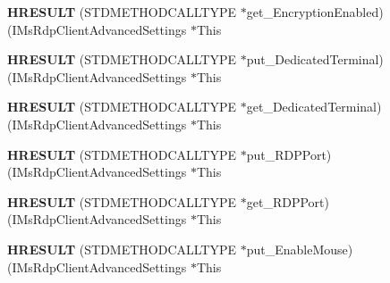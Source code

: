 \begin{DoxyCompactItemize}
\item 
\mbox{\label{struct_i_ms_rdp_client_advanced_settings_vtbl_a68eb7122c2b54db059b795c253e03cb8}} 
{\bfseries H\+R\+E\+S\+U\+LT} (S\+T\+D\+M\+E\+T\+H\+O\+D\+C\+A\+L\+L\+T\+Y\+PE $\ast$get\+\_\+\+Encryption\+Enabled)(I\+Ms\+Rdp\+Client\+Advanced\+Settings $\ast$This
\item 
\mbox{\label{struct_i_ms_rdp_client_advanced_settings_vtbl_a6a3a48647570818cb514e15f63d0fb10}} 
{\bfseries H\+R\+E\+S\+U\+LT} (S\+T\+D\+M\+E\+T\+H\+O\+D\+C\+A\+L\+L\+T\+Y\+PE $\ast$put\+\_\+\+Dedicated\+Terminal)(I\+Ms\+Rdp\+Client\+Advanced\+Settings $\ast$This
\item 
\mbox{\label{struct_i_ms_rdp_client_advanced_settings_vtbl_af6a54e4b15f00903c8cc01e390228160}} 
{\bfseries H\+R\+E\+S\+U\+LT} (S\+T\+D\+M\+E\+T\+H\+O\+D\+C\+A\+L\+L\+T\+Y\+PE $\ast$get\+\_\+\+Dedicated\+Terminal)(I\+Ms\+Rdp\+Client\+Advanced\+Settings $\ast$This
\item 
\mbox{\label{struct_i_ms_rdp_client_advanced_settings_vtbl_a83a7401e0de0995b142c2a0571aa9b78}} 
{\bfseries H\+R\+E\+S\+U\+LT} (S\+T\+D\+M\+E\+T\+H\+O\+D\+C\+A\+L\+L\+T\+Y\+PE $\ast$put\+\_\+\+R\+D\+P\+Port)(I\+Ms\+Rdp\+Client\+Advanced\+Settings $\ast$This
\item 
\mbox{\label{struct_i_ms_rdp_client_advanced_settings_vtbl_a860fd9a5eda52ef87a67a083be35117c}} 
{\bfseries H\+R\+E\+S\+U\+LT} (S\+T\+D\+M\+E\+T\+H\+O\+D\+C\+A\+L\+L\+T\+Y\+PE $\ast$get\+\_\+\+R\+D\+P\+Port)(I\+Ms\+Rdp\+Client\+Advanced\+Settings $\ast$This
\item 
\mbox{\label{struct_i_ms_rdp_client_advanced_settings_vtbl_a13d858f34ae79ca586aa383e41123fc0}} 
{\bfseries H\+R\+E\+S\+U\+LT} (S\+T\+D\+M\+E\+T\+H\+O\+D\+C\+A\+L\+L\+T\+Y\+PE $\ast$put\+\_\+\+Enable\+Mouse)(I\+Ms\+Rdp\+Client\+Advanced\+Settings $\ast$This
\item 
\mbox{\label{struct_i_ms_rdp_client_advanced_settings_vtbl_accb8482493b7f573e5009d61634d6cdd}} 

\end{DoxyCompactItemize}
